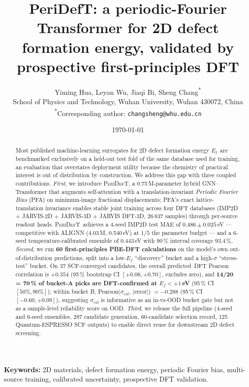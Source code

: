 \documentclass[11pt,a4paper]{article}
\title{\textbf{PeriDefT: a periodic-Fourier Transformer for 2D defect
formation energy, validated by prospective first-principles DFT}}
\author{%
  Yiming Hua, Leyan Wu, Jiaqi Bi, Sheng Chang\textsuperscript{*} \\[2pt]
  \small School of Physics and Technology, Wuhan University, Wuhan 430072, China \\[1pt]
  \small \textsuperscript{*}Corresponding author: \texttt{changsheng@whu.edu.cn}
}
\date{\today}
\newcommand{\Ef}{$E_{\mathrm{f}}$}
\newcommand{\modelname}{\textsc{PeriDefT}}
\begin{document}
\maketitle

\begin{abstract}
\noindent
Most published machine-learning surrogates for 2D defect formation
energy \Ef\ are benchmarked exclusively on a held-out test fold of
the same database used for training, an evaluation that overstates
deployment utility because the chemistry of practical interest is
out of distribution by construction. We address this gap with three
coupled contributions. \emph{First}, we introduce \modelname, a
0.75\,M-parameter hybrid GNN--Transformer that augments
self-attention with a translation-invariant \emph{Periodic Fourier
Bias} (PFA) on minimum-image fractional displacements; PFA's exact
lattice-translation invariance enables stable joint training across
four DFT databases (IMP2D + JARVIS-2D + JARVIS-3D + JARVIS DFT-3D,
26\,837 samples) through per-source readout heads. \modelname\
achieves a 4-seed IMP2D test MAE of $0.486\pm0.025$\,eV ---
competitive with ALIGNN (4.03\,M, 0.540\,eV) at $1/5$ the parameter
budget --- and a 6-seed temperature-calibrated ensemble of 0.443\,eV
with 90\,\% interval coverage 93.4\,\%. \emph{Second}, we run
\textbf{60 first-principles PBE-DFT calculations} on the model's
own out-of-distribution predictions, split into a low-$E_f$
``discovery'' bucket and a high-$\sigma$ ``stress-test'' bucket.
On 37 SCF-converged candidates, the overall predicted--DFT
Pearson correlation is $+0.354$ (95\,\% bootstrap CI
$[+0.06, +0.70]$, excludes zero), and \textbf{14/20 = 70\,\%
of bucket-A picks are DFT-confirmed at $E_f<+1$\,eV}
(95\,\% CI $[50\%, 90\%]$); within bucket B,
Pearson($\sigma_{\mathrm{cal}}$, $|\mathrm{error}|$) $= -0.288$
(95\,\% CI $[-0.60, +0.09]$), suggesting $\sigma_{\mathrm{cal}}$
is informative as an in-vs-OOD bucket gate but not as a sample-level
reliability score on OOD. \emph{Third}, we release the full
pipeline (4-seed and 6-seed ensembles, 287 candidate generation,
60-candidate selection record, 125 Quantum-ESPRESSO SCF outputs)
to enable direct reuse for downstream 2D defect screening.
\end{abstract}

\bigskip
\noindent\textbf{Keywords:} 2D materials, defect formation energy,
periodic Fourier bias, multi-source training, calibrated uncertainty,
prospective DFT validation.
\end{document}
